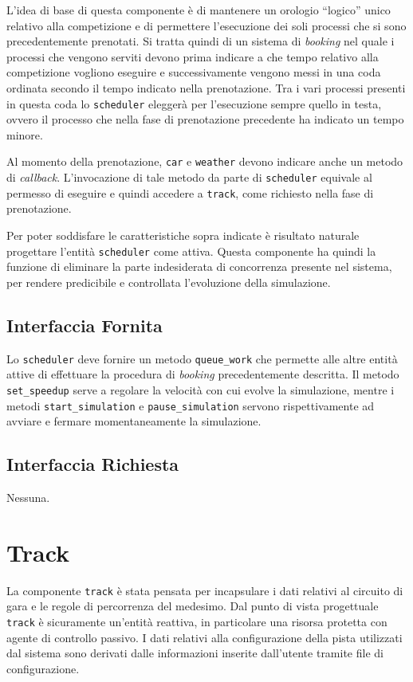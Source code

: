 \documentclass[a4paper]{report}
\newcommand{\fun}[1]{\texttt{#1}}
\begin{document}
L'idea di base di questa componente è di mantenere un orologio ``logico'' unico relativo alla competizione e di permettere l'esecuzione dei soli processi che si sono precedentemente prenotati. Si tratta quindi di un sistema di \textit{booking} nel quale i processi che vengono serviti devono prima indicare a che tempo relativo alla competizione vogliono eseguire e successivamente vengono messi in una coda ordinata secondo il tempo indicato nella prenotazione. Tra i vari processi presenti in questa coda lo \texttt{scheduler} eleggerà per l'esecuzione sempre quello in testa, ovvero il processo che nella fase di prenotazione precedente ha indicato un tempo minore.

Al momento della prenotazione, \texttt{car} e \texttt{weather} devono indicare anche un metodo di \textit{callback}. L'invocazione di tale metodo da parte di \texttt{scheduler} equivale al permesso di eseguire e quindi accedere a \texttt{track}, come richiesto nella fase di prenotazione.

Per poter soddisfare le caratteristiche sopra indicate è risultato naturale progettare l'entità \texttt{scheduler} come attiva.
Questa componente ha quindi la funzione di eliminare la parte indesiderata di concorrenza presente nel sistema, per rendere predicibile e controllata l'evoluzione della simulazione.

\subsection*{Interfaccia Fornita}
Lo \texttt{scheduler} deve fornire un metodo \fun{queue\_work} che permette alle altre entità attive di effettuare la procedura di \textit{booking} precedentemente descritta.
Il metodo \fun{set\_speedup} serve a regolare la velocità con cui evolve la simulazione, mentre i metodi \fun{start\_simulation} e \fun{pause\_simulation} servono rispettivamente ad avviare e fermare momentaneamente la simulazione.

\subsection*{Interfaccia Richiesta}
Nessuna.

\section{Track}
La componente \texttt{track} è stata pensata per incapsulare i dati relativi al circuito di gara e le regole di percorrenza del medesimo. Dal punto di vista progettuale \texttt{track} è sicuramente un'entità reattiva, in particolare una risorsa protetta con agente di controllo passivo.
I dati relativi alla configurazione della pista utilizzati dal sistema sono derivati dalle informazioni inserite dall'utente tramite file di configurazione.
\end{document}
